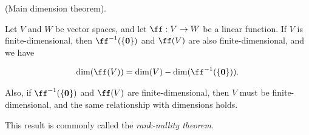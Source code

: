 \begin{theorem}
\label{ch::lin_alg::thm::main_dim}
    (Main dimension theorem).
    
    Let $V$ and $W$ be vector spaces, and let $\ff:V \rightarrow W$ be a linear function. If $V$ is finite-dimensional, then $\ff^{-1}(\{\mathbf{0}\})$ and $\ff(V)$ are also finite-dimensional, and we have

    \begin{align*}
        \dim(\ff(V)) = \dim(V) - \dim(\ff^{-1}(\{\mathbf{0}\})).
    \end{align*}
    
    Also, if $\ff^{-1}(\{\mathbf{0}\})$ and $\ff(V)$ are finite-dimensional, then $V$ must be finite-dimensional, and the same relationship with dimensions holds.
    
    This result is commonly called the \textit{rank-nullity theorem}.
\end{theorem}

